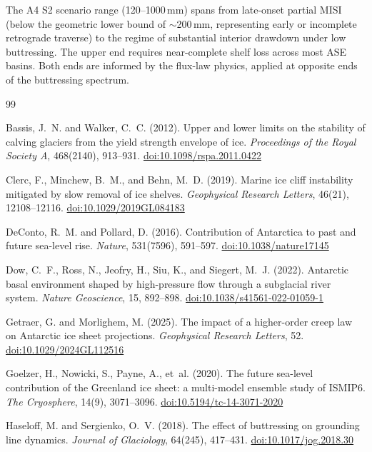 \documentclass[11pt]{article}
\newcommand{\doi}[1]{\href{https://doi.org/#1}{doi:#1}}
\begin{document}
The A4 S2 scenario range (120--1000\,mm) spans from late-onset partial MISI (below the geometric lower bound of $\sim$200\,mm, representing early or incomplete retrograde traverse) to the regime of substantial interior drawdown under low buttressing. The upper end requires near-complete shelf loss across most ASE basins. Both ends are informed by the flux-law physics, applied at opposite ends of the buttressing spectrum.




\begin{thebibliography}{99}

Bassis, J.~N. and Walker, C.~C. (2012).
Upper and lower limits on the stability of calving glaciers from the yield strength envelope of ice.
\textit{Proceedings of the Royal Society A}, 468(2140), 913--931.
\doi{10.1098/rspa.2011.0422}

Clerc, F., Minchew, B.~M., and Behn, M.~D. (2019).
Marine ice cliff instability mitigated by slow removal of ice shelves.
\textit{Geophysical Research Letters}, 46(21), 12108--12116.
\doi{10.1029/2019GL084183}

DeConto, R.~M. and Pollard, D. (2016).
Contribution of {A}ntarctica to past and future sea-level rise.
\textit{Nature}, 531(7596), 591--597.
\doi{10.1038/nature17145}

Dow, C.~F., Ross, N., Jeofry, H., Siu, K., and Siegert, M.~J. (2022).
Antarctic basal environment shaped by high-pressure flow through a subglacial river system.
\textit{Nature Geoscience}, 15, 892--898.
\doi{10.1038/s41561-022-01059-1}

Getraer, G. and Morlighem, M. (2025).
The impact of a higher-order creep law on {A}ntarctic ice sheet projections.
\textit{Geophysical Research Letters}, 52.
\doi{10.1029/2024GL112516}

Goelzer, H., Nowicki, S., Payne, A., et~al. (2020).
The future sea-level contribution of the {G}reenland ice sheet: a multi-model ensemble study of {ISMIP6}.
\textit{The Cryosphere}, 14(9), 3071--3096.
\doi{10.5194/tc-14-3071-2020}

Haseloff, M. and Sergienko, O.~V. (2018).
The effect of buttressing on grounding line dynamics.
\textit{Journal of Glaciology}, 64(245), 417--431.
\doi{10.1017/jog.2018.30}


\end{thebibliography}
\end{document}
